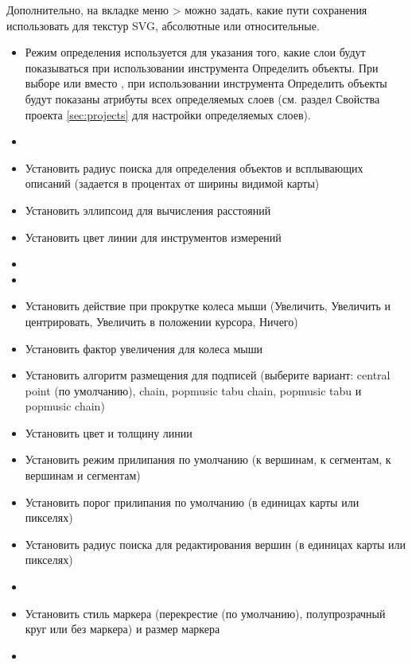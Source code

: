 Дополнительно, на вкладке  меню  >  можно задать, какие пути сохранения использовать для текстур SVG, абсолютные или относительные.


\begin{itemize}
\item Режим определения используется для указания того, какие слои будут показываться при использовании инструмента Определить объекты. При выборе  или  вместо , при использовании инструмента Определить объекты будут показаны атрибуты всех определяемых слоев (см. раздел Свойства проекта \ref{sec:projects} для настройки определяемых слоев).
\item {}
\item Установить радиус поиска для определения объектов и всплывающих описаний (задается в процентах от ширины видимой карты)
\item Установить эллипсоид для вычисления расстояний
\item Установить цвет линии для инструментов измерений
\item {}
\item {}
\item Установить действие при прокрутке колеса мыши (Увеличить, Увеличить и центрировать, Увеличить в положении курсора, Ничего)
\item Установить фактор увеличения для колеса мыши
\end{itemize}


\begin{itemize}
\item Установить алгоритм размещения для подписей (выберите вариант: central point
(по умолчанию), chain, popmusic tabu chain, popmusic tabu и popmusic chain)
\end{itemize}


\begin{itemize}
\item Установить цвет и толщину линии
\item Установить режим прилипания по умолчанию (к вершинам, к сегментам, к вершинам и сегментам)
\item Установить порог прилипания по умолчанию (в единицах карты или пикселях)
\item Установить радиус поиска для редактирования вершин (в единицах карты или пикселях)
\item {}
\item Установить стиль маркера (перекрестие (по умолчанию), полупрозрачный круг или без маркера) и размер маркера
\item {}
\end{itemize}

